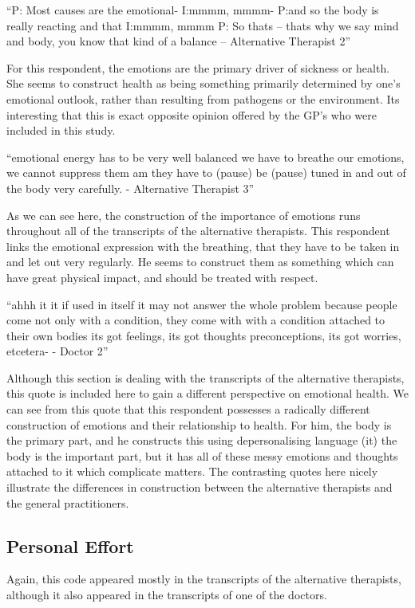 ``P: Most causes are the emotional-
I:mmmm, mmmm-
P:and so the body is really reacting and that
I:mmmm, mmmm
P: So thats – thats why we say mind and body, you know that kind of a balance – Alternative Therapist 2''

For this respondent, the emotions are the primary driver of sickness or health. She seems to construct health as being something primarily determined by one's emotional outlook, rather than resulting from pathogens or the environment. Its interesting that this is exact opposite opinion offered by the GP's who were included in this study. 

``emotional energy has to be very well balanced we have to breathe our emotions, we cannot suppress them am they have to (pause) be (pause) tuned in and out of the body very carefully. - Alternative Therapist 3''

As we can see here, the construction of the importance of emotions runs throughout all of the transcripts of the alternative therapists. This respondent links the emotional expression with the breathing, that they have to be taken in and let out very regularly. He seems to construct them as something which can have great physical impact, and should be treated with respect.


``ahhh it it if used in itself it may not answer the whole problem because people come not only with a condition, they come with with a condition attached to their own bodies its got feelings, its got thoughts preconceptions, its got worries, etcetera- - Doctor 2''

Although this section is dealing with the transcripts of the alternative therapists, this quote is included here to gain a different perspective on emotional health. We can see from this quote that this respondent possesses a radically different construction of emotions and their relationship to health. For him, the body is the primary part, and he constructs this using depersonalising language (it) the body is the important part, but it has all of these messy emotions and thoughts attached to it which complicate matters. The contrasting quotes here nicely illustrate the differences in construction between the alternative therapists and the general practitioners. 


\subsection{Personal Effort}

Again, this code appeared mostly in the transcripts of the alternative therapists, although it also appeared in the transcripts of one of the doctors. 


